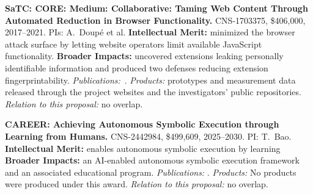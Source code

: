 \medskip
\noindent\textbf{SaTC: CORE: Medium: Collaborative: Taming Web Content
Through Automated Reduction in Browser Functionality.} CNS-1703375,
\$406,000, 2017--2021. PIs: A.~Doup\'e et al.
\textbf{Intellectual Merit:} minimized the browser attack surface by letting
website operators limit available JavaScript functionality.
\textbf{Broader Impacts:} uncovered extensions leaking personally identifiable
information and produced two defenses reducing extension
fingerprintability.
\emph{Publications:}~\cite{mystique-CCS18,wildextensions-dimva19,extbloat-www2019,cloakx-sec19,jahanshahi20:sqlblock}.
\emph{Products:} prototypes and measurement data released through the project
websites and the investigators' public repositories.
\emph{Relation to this proposal:} no overlap.


\medskip
\noindent\textbf{CAREER: Achieving Autonomous Symbolic Execution through
Learning from Humans.} CNS-2442984, \$499,609, 2025--2030. PI: T.~Bao.
\textbf{Intellectual Merit:} enables autonomous symbolic execution by learning
\textbf{Broader Impacts:} an AI-enabled autonomous symbolic execution framework
and an associated educational program.
\emph{Publications:} \cite{sedbg,zeng2026ropbot}.
\emph{Products:} No products were produced under this award.
\emph{Relation to this proposal:} no overlap.
